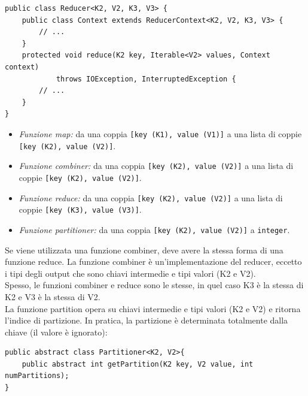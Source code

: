 \documentclass{article}
\begin{document}
\begin{appendices}
\begin{lstlisting}
public class Reducer<K2, V2, K3, V3> {
    public class Context extends ReducerContext<K2, V2, K3, V3> {
        // ...
    }
    protected void reduce(K2 key, Iterable<V2> values, Context context)
            throws IOException, InterruptedException {
        // ...
    }
}
\end{lstlisting}
\begin{itemize}
    \item \textit{Funzione map:} da una coppia \texttt{[key (K1), value (V1)]} a una lista di coppie \texttt{[key (K2), value (V2)]}.
    \item \textit{Funzione combiner:} da una coppia \texttt{[key (K2), value (V2)]} a una lista di coppie \texttt{[key (K2), value (V2)]}.
    \item \textit{Funzione reduce:} da una coppia \texttt{[key (K2), value (V2)]} a una lista di coppie \texttt{[key (K3), value (V3)]}.
    \item \textit{Funzione partitioner:} da una coppia \texttt{[key (K2), value (V2)]} a \texttt{integer}.
\end{itemize}
Se viene utilizzata una funzione combiner, deve avere la stessa forma di una funzione reduce. La funzione combiner è un'implementazione del reducer, eccetto i tipi degli output che sono chiavi intermedie e tipi valori (K2 e V2). \\
Spesso, le funzioni combiner e reduce sono le stesse, in quel caso K3 è la stessa di K2 e V3 è la stessa di V2. \\
La funzione partition opera su chiavi intermedie e tipi valori (K2 e V2) e ritorna l'indice di partizione. In pratica, la partizione è determinata totalmente dalla chiave (il valore è ignorato):
\begin{lstlisting}
public abstract class Partitioner<K2, V2>{
    public abstract int getPartition(K2 key, V2 value, int numPartitions);
}
\end{lstlisting}


\end{appendices}
\end{document}
